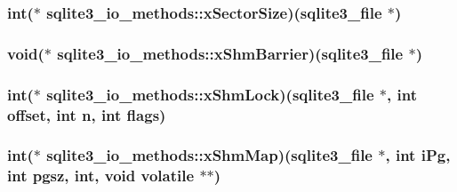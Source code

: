 \hypertarget{structsqlite3__io__methods_a8436e6eeac404b35057be97f3c2b5c3d}{
\subsubsection[{x\-Sector\-Size}]{\setlength{\rightskip}{0pt plus 5cm}int($\ast$ sqlite3\-\_\-io\-\_\-methods\-::x\-Sector\-Size)({\bf sqlite3\-\_\-file} $\ast$)}}\label{structsqlite3__io__methods_a8436e6eeac404b35057be97f3c2b5c3d}
\hypertarget{structsqlite3__io__methods_aedf4a59fa25ad33e0625a2aa0f6f2184}{
\subsubsection[{x\-Shm\-Barrier}]{\setlength{\rightskip}{0pt plus 5cm}void($\ast$ sqlite3\-\_\-io\-\_\-methods\-::x\-Shm\-Barrier)({\bf sqlite3\-\_\-file} $\ast$)}}\label{structsqlite3__io__methods_aedf4a59fa25ad33e0625a2aa0f6f2184}
\hypertarget{structsqlite3__io__methods_a58f4a6b0df86440029cc5fa1b65b1b4e}{
\subsubsection[{x\-Shm\-Lock}]{\setlength{\rightskip}{0pt plus 5cm}int($\ast$ sqlite3\-\_\-io\-\_\-methods\-::x\-Shm\-Lock)({\bf sqlite3\-\_\-file} $\ast$, int offset, int n, int flags)}}\label{structsqlite3__io__methods_a58f4a6b0df86440029cc5fa1b65b1b4e}
\hypertarget{structsqlite3__io__methods_a42d21006b7f01acb258986f2c090c64d}{
\subsubsection[{x\-Shm\-Map}]{\setlength{\rightskip}{0pt plus 5cm}int($\ast$ sqlite3\-\_\-io\-\_\-methods\-::x\-Shm\-Map)({\bf sqlite3\-\_\-file} $\ast$, int i\-Pg, int pgsz, int, void volatile $\ast$$\ast$)}}\label{structsqlite3__io__methods_a42d21006b7f01acb258986f2c090c64d}
